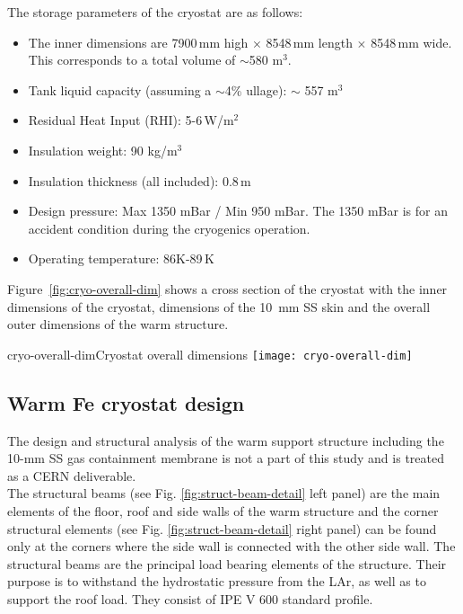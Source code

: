 The storage parameters of the cryostat are as follows:
\begin{itemize} %
\item The inner dimensions are 7900\,mm high $\times$ 8548\,mm length $\times$ 8548\,mm wide.  This corresponds to a total volume of $\sim$580 m$^3$. 
\item Tank liquid capacity (assuming a $\sim$4\% ullage): $\sim$ 557 m$^3$
\item Residual Heat Input (RHI): 5-6\,W/m$^2$
\item Insulation weight: 90 kg/m$^3$  
\item Insulation thickness (all included): 0.8\,m 
\item Design pressure: Max 1350 mBar / Min 950 mBar.  The 1350 mBar is for an accident condition during the cryogenics operation.
\item Operating temperature: 86K-89\,K
\end{itemize}

Figure~\ref{fig:cryo-overall-dim} shows a cross section of the cryostat with the inner dimensions of the cryostat, dimensions of the \SI{10}{mm} SS skin and the overall outer dimensions of the warm structure.

\begin{cdrfigure}{cryo-overall-dim}{Cryostat overall dimensions}
  \texttt{[image: cryo-overall-dim]}
\end{cdrfigure}

\subsection{Warm Fe cryostat design}


The design and structural analysis of the warm support structure including the 10-mm SS gas containment membrane is not a part of this study and is %
treated as a CERN deliverable. \\
%
The structural beams (see Fig. \ref{fig:struct-beam-detail} left panel) are the main elements of the floor, roof and side walls of the warm structure and the corner structural elements (see Fig. \ref{fig:struct-beam-detail} right panel) can be found only at the corners where the side wall is connected with the other side wall. The structural beams are the principal load bearing elements of the structure. Their purpose is to withstand the hydrostatic pressure from the LAr, as well as to support the roof load. They consist of IPE V 600 standard profile. 

